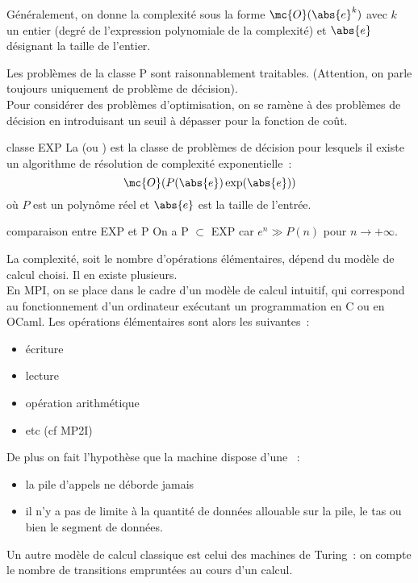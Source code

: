\begin{adjustwidth}{-3cm}{-3cm}
\begin{remarque}{}{}
    Généralement, on donne la complexité sous la forme $\mc{O}(\abs{e}^k)$ avec $k$ un entier (degré de l'expression polynomiale de la complexité) et $\abs{e}$ désignant la taille de l'entier.
\end{remarque}

\begin{remarque}{}{}
    Les problèmes de la classe P sont raisonnablement traitables. (Attention, on parle toujours uniquement de problème de décision).\\
    Pour considérer des problèmes d'optimisation, on se ramène à des problèmes de décision en introduisant un seuil à dépasser pour la fonction de coût.
\end{remarque}

\begin{remarque}{}{classe EXP}
    La  (ou ) est la classe de problèmes de décision pour lesquels il existe un algorithme de résolution de complexité exponentielle~:
    $$\mc{O}(P(\abs{e})\exp(\abs{e}))$$
    où $P$ est un polynôme réel et $\abs{e}$ est la taille de l'entrée.
\end{remarque}

\begin{remarque}{}{comparaison entre EXP et P}
    On a P $\subset$ EXP car $e^n \gg P(n)$ pour $n \to +\infty$.
\end{remarque}

\begin{remarque}{}{}
    La complexité, soit le nombre d'opérations élémentaires, dépend du modèle de calcul choisi. Il en existe plusieurs.\\
    En MPI, on se place dans le cadre d'un modèle de calcul intuitif, qui correspond au fonctionnement d'un ordinateur exécutant un programmation en C ou en OCaml. Les opérations élémentaires sont alors les suivantes~:
    \begin{itemize}
        \item écriture
        \item lecture
        \item opération arithmétique
        \item etc (cf MP2I)
    \end{itemize}
    De plus on fait l'hypothèse que la machine dispose d'une ~:
    \begin{itemize}
        \item la pile d'appels ne déborde jamais
        \item il n'y a pas de limite à la quantité de données allouable sur la pile, le tas ou bien le segment de données.
    \end{itemize}
    Un autre modèle de calcul classique est celui des machines de Turing~: on compte le nombre de transitions empruntées au cours d'un calcul.
\end{remarque}


\end{adjustwidth}
